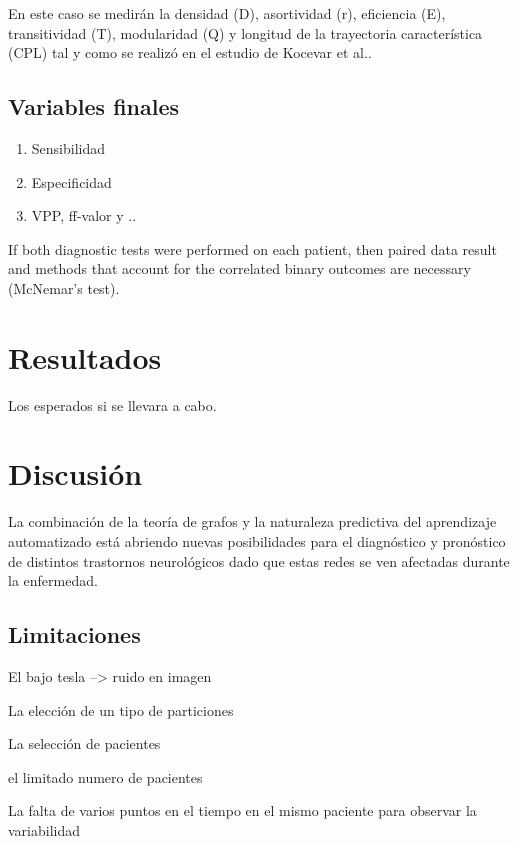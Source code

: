 \documentclass[fleqn,10pt]{UICArticle} %
\begin{document}
En este caso se medirán la densidad (D), asortividad (r), eficiencia (E), transitividad (T), modularidad (Q) y longitud de la trayectoria característica (CPL) tal y como se realizó en el estudio de Kocevar et al.\cite{Kocevar2016}.

\subsection{Variables finales}


\begin{enumerate}[noitemsep]
\item Sensibilidad
\item Especificidad
\item VPP, ff-valor y ..
\end{enumerate}

If both diagnostic tests were performed on each patient, then paired data result and methods that account for the correlated binary outcomes are necessary (McNemar's test).


\section{Resultados}
Los esperados si se llevara a cabo.

\section{Discusión}

La combinación de la teoría de grafos y la naturaleza predictiva del aprendizaje automatizado está abriendo nuevas posibilidades para el diagnóstico y pronóstico de distintos trastornos neurológicos dado que estas redes se ven afectadas durante la enfermedad. 


\subsection{Limitaciones}

\begin{list}{-}
\item El bajo tesla --> ruido en imagen
\item La elección de un tipo de particiones
\item La selección de pacientes
\item el limitado numero de pacientes
\item La falta de varios puntos en el tiempo en el mismo paciente para observar la variabilidad
\end{list}
\end{document}
